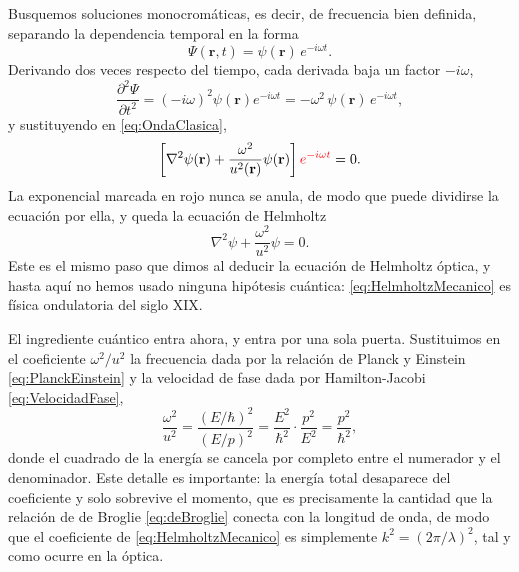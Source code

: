         Busquemos soluciones monocromáticas, es decir, de frecuencia bien definida, separando la dependencia temporal en la forma
        \begin{equation}\label{eq:SeparacionMonocromatica}
            \Psi(\mathbf{r},t) = \psi(\mathbf{r})\,e^{-i\omega t} .
        \end{equation}
        Derivando dos veces respecto del tiempo, cada derivada baja un factor $-i\omega$,
        \begin{equation}\label{eq:SegundaDerivadaTemporal}
            \frac{\partial^{2}\Psi}{\partial t^{2}} = \left(-i\omega\right)^{2}\psi(\mathbf{r})e^{-i\omega t} = -\omega^{2}\,\psi(\mathbf{r})\,e^{-i\omega t},
        \end{equation}
        y sustituyendo en \eqref{eq:OndaClasica},
        \begin{equation}\label{eq:HelmholtzPaso}
            \left[\nabla^{2}\psi(\mathbf{r}) + \frac{\omega^{2}}{u^{2}(\mathbf{r})}\psi(\mathbf{r})\right]\textcolor{red}{e^{-i\omega t}} = 0 .
        \end{equation}
        La exponencial marcada en rojo nunca se anula, de modo que puede dividirse la ecuación por ella, y queda la ecuación de Helmholtz
        \begin{equation}\label{eq:HelmholtzMecanico}
            \nabla^{2}\psi + \frac{\omega^{2}}{u^{2}}\psi = 0 .
        \end{equation}
        Este es el mismo paso que dimos al deducir la ecuación de Helmholtz óptica, y hasta aquí no hemos usado ninguna hipótesis cuántica: \eqref{eq:HelmholtzMecanico} es física ondulatoria del siglo XIX.

        El ingrediente cuántico entra ahora, y entra por una sola puerta. Sustituimos en el coeficiente $\omega^{2}/u^{2}$ la frecuencia dada por la relación de Planck y Einstein \eqref{eq:PlanckEinstein} y la velocidad de fase dada por Hamilton-Jacobi \eqref{eq:VelocidadFase},
        \begin{equation}\label{eq:CoeficienteSustituido}
            \frac{\omega^{2}}{u^{2}} = \frac{\left(E/\hbar\right)^{2}}{\left(E/p\right)^{2}}
            = \frac{E^{2}}{\hbar^{2}}\cdot\frac{p^{2}}{E^{2}}
            = \frac{p^{2}}{\hbar^{2}},
        \end{equation}
        donde el cuadrado de la energía se cancela por completo entre el numerador y el denominador. Este detalle es importante: la energía total desaparece del coeficiente y solo sobrevive el momento, que es precisamente la cantidad que la relación de de Broglie \eqref{eq:deBroglie} conecta con la longitud de onda, de modo que el coeficiente de \eqref{eq:HelmholtzMecanico} es simplemente $k^{2} = (2\pi/\lambda)^{2}$, tal y como ocurre en la óptica.

